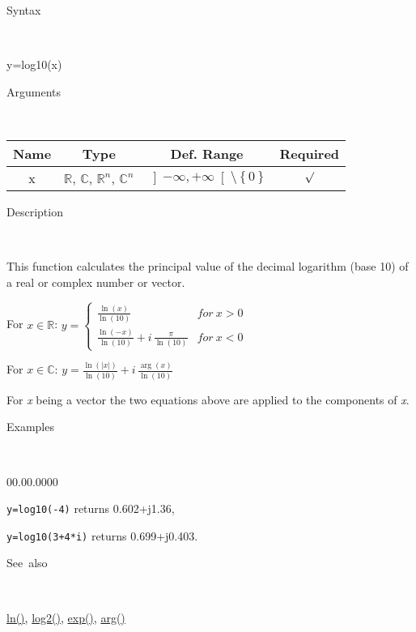 \begin{description}
\item [Syntax]~
\end{description}
y=log10(x)

\begin{description}
\item [Arguments]~
\end{description}
\begin{tabular}{|c|c|c|c|}
\hline 
Name&
Type&
Def. Range&
Required\tabularnewline
\hline
\hline 
x&
$\mathbb{R}$, $\mathbb{C}$, $\mathbb{R}^{n}$, $\mathbb{C}^{n}$&
$\left]-\infty,+\infty\right[\setminus\left\{ 0\right\} $&
$\surd$\tabularnewline
\hline
\end{tabular}

\begin{description}
\item [Description]~
\end{description}
This function calculates the principal value of the decimal logarithm
(base 10) of a real or complex number or vector.

\medskip{}
For $x\in\mathbb{R}$: $y=\left\{ \begin{array}{cc}
{\displaystyle \frac{\ln\left(x\right)}{\ln\left(10\right)}} & for\: x>0\\
{\displaystyle \frac{\ln\left(-x\right)}{\ln\left(10\right)}}+i\,{\displaystyle \frac{\pi}{\ln\left(10\right)}} & for\: x<0\end{array}\right.$ 

\medskip{}
For $x\in\mathbb{C}$: $y={\displaystyle \frac{\ln\left(\left|x\right|\right)}{\ln\left(10\right)}}+i\,{\displaystyle \frac{\arg\left(x\right)}{\ln\left(10\right)}}$
\medskip{}

\noindent For \textit{x} being a vector the two equations above are
applied to the components of \textit{x}.

\begin{description}
\item [Examples]~
\end{description}
\begin{lyxlist}{00.00.0000}
\item [\texttt{y=log10(-4)}]returns 0.602+j1.36,
\item [\texttt{y=log10(3+4{*}i)}]returns 0.699+j0.403.
\end{lyxlist}
\begin{description}
\item [See~also]~
\end{description}
\textcolor{blue}{\hyperlink{ln}{ln()}}\textcolor{black}{,} \textcolor{blue}{\hyperlink{log2}{log2()}}\textcolor{black}{,}
\textcolor{blue}{\hyperlink{exp}{exp()}}\textcolor{black}{,} \textcolor{blue}{\hyperlink{arg}{arg()}}


